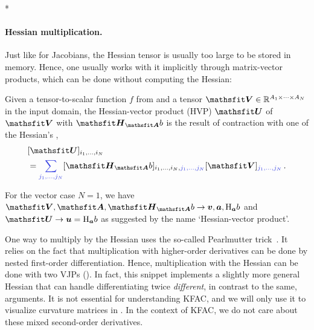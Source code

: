 \switchcolumn[1]*
\switchcolumn[0]

\paragraph{Hessian multiplication.}
Just like for Jacobians, the Hessian tensor is usually too large to be stored in memory.
Hence, one usually works with it implicitly through matrix-vector products, which can be done without computing the Hessian:

\begin{definition}\label{def:hvp}
  Given a tensor-to-scalar function $f$ from  and a tensor $\tV \in \sR^{A_1 \times \dots \times A_N}$ in the input domain, the Hessian-vector product (HVP) $\tU$ of $\tV$ with $\tH_{\tA}b$ is the result of contraction with one of the Hessian's ,
  \begin{align*}
     & [\tU]_{i_1, \dots, i_N}
    \\
     & =
    \colored{\sum_{j_1, \dots, j_N}}
    [\tH_{\tA}b]_{i_1, \dots, i_N, \colored{j_1, \dots, j_N}} [\tV]_{\colored{j_1, \dots, j_N}}\,.
  \end{align*}
\end{definition}
For the vector case $N=1$, we have $\tV, \tA, \tH_{\tA}b \to \vv, \va, \hess_{\va}b$ and $\tU \to \vu = \hess_{\va} b$ as suggested by the name `Hessian-vector product'.

One way to multiply by the Hessian uses the so-called Pearlmutter trick~\cite{pearlmutter1994fast}.
It relies on the fact that multiplication with higher-order derivatives can be done by nested first-order differentiation.
Hence, multiplication with the Hessian can be done with two VJPs ().
In fact, this snippet implements a slightly more general Hessian that can handle differentiating twice \wrt \emph{different}, in contrast to the same, arguments.
It is not essential for understanding KFAC, and we will only use it to visualize curvature matrices in .
In the context of KFAC, we do not care about these mixed second-order derivatives.

